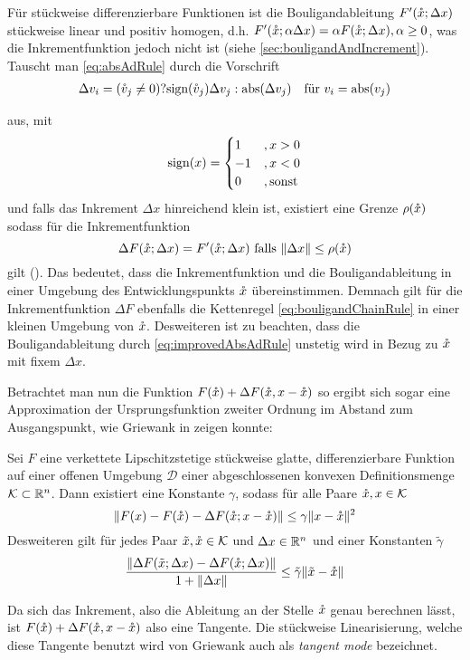 Für stückweise differenzierbare Funktionen ist die Bouligandableitung $F'(\mathring{x};\Delta x)$ stückweise linear und positiv homogen, d.h. $F'(\mathring{x};\alpha \Delta x) = \alpha F(\mathring{x};\Delta x), \alpha\geq 0$, was die Inkrementfunktion jedoch nicht ist  (siehe \ref{sec:bouligandAndIncrement}).
Tauscht man \eqref{eq:absAdRule} durch die Vorschrift
\begin{equation}
 \label{eq:improvedAbsAdRule}
 \begin{aligned}
  \Delta v_i &= (\mathring{v}_j \neq 0)?\text{sign}(\mathring{v}_j)\Delta v_j:\operatorname{abs}(\Delta v_j) &\text{für } v_i = \operatorname{abs}(v_j)
 \end{aligned}
\end{equation}

aus, mit
\[
 \text{sign}(x) = \begin{cases}
            1 &, x>0\\
            -1&, x<0\\
            0 &, \text{sonst}
           \end{cases}
\]
und falls das Inkrement $\Delta x$ hinreichend klein ist, existiert eine Grenze $\rho(\mathring{x})$ sodass für die Inkrementfunktion 
 \[
  \Delta F(\mathring{x};\Delta x) = F'(\mathring{x};\Delta x)\text{ falls }\|\Delta x\|\leq \rho(\mathring{x})
 \]
gilt  (\cite[S.10 ff]{monster}). Das bedeutet, dass die Inkrementfunktion und die Bouligandableitung in einer Umgebung des Entwicklungspunkts $\mathring{x}$ übereinstimmen. Demnach gilt für die Inkrementfunktion $\Delta F$ ebenfalls die Kettenregel \eqref{eq:bouligandChainRule} in einer kleinen Umgebung von $\mathring{x}$. Desweiteren ist zu beachten, dass die Bouligandableitung durch \eqref{eq:improvedAbsAdRule} unstetig wird in Bezug zu $\mathring{x}$ mit fixem $\Delta x$. 

Betrachtet man nun die Funktion $F(\mathring{x})+\Delta F(\mathring{x}, x-\mathring{x})$ so ergibt sich sogar eine Approximation der Ursprungsfunktion zweiter Ordnung im Abstand zum Ausgangspunkt, wie Griewank in \cite[Prop.1]{monster} zeigen konnte:

\begin{theorem}
\label{thm:quadrApproxPL}
 Sei $F$ eine verkettete Lipschitzstetige stückweise glatte, differenzierbare Funktion auf einer offenen Umgebung $\mathcal D$ einer abgeschlossenen konvexen Definitionsmenge $\mathcal K \subset \mathbb{R}^n$. Dann existiert eine Konstante $\gamma$, sodass für alle Paare $\mathring{x},x\in \mathcal K$
 \[
  \|F(x) - F(\mathring{x}) - \Delta F(\mathring{x};x-\mathring{x})\| \leq \gamma \|x-\mathring{x}\|^2
 \]
 Desweiteren gilt für jedes Paar $\tilde x,\mathring{x}\in \mathcal K$ und $\Delta x\in \mathbb{R}^n$ und einer Konstanten $\tilde\gamma$
 \[
  \frac{\|\Delta F(\tilde x;\Delta x) - \Delta F(\mathring{x};\Delta x)\|}{1+\|\Delta x\|}\leq \tilde \gamma \|\tilde x - \mathring{x}\|
 \]
\end{theorem}
Da sich das Inkrement, also die Ableitung an der Stelle $\mathring{x}$ genau berechnen lässt, ist $F(\mathring{x})+\Delta F(\mathring{x}, x-\mathring{x})$ also eine Tangente. Die stückweise Linearisierung, welche diese Tangente benutzt wird von Griewank auch als \textit{tangent mode} bezeichnet. 

